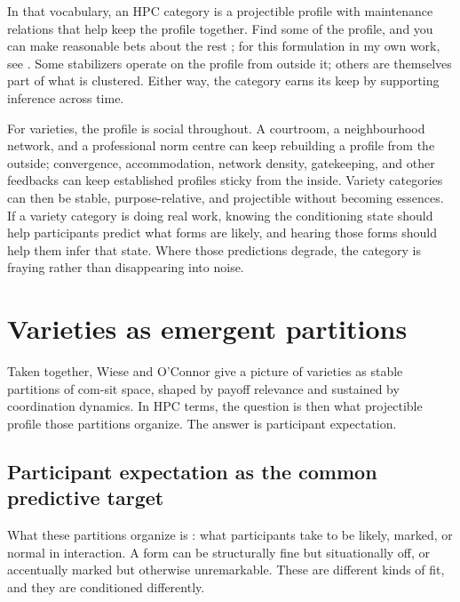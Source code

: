 \documentclass[11pt,letterpaper]{article}
\begin{document}
In that vocabulary, an HPC category is a projectible profile with maintenance relations that help keep the profile together. Find some of the profile, and you can make reasonable bets about the rest \citep{boyd1991,boyd1999}; for this formulation in my own work, see \textcite[chaps.~6 and 16]{reynolds2025hpcbook}. Some stabilizers operate on the profile from outside it; others are themselves part of what is clustered. Either way, the category earns its keep by supporting inference across time.

For varieties, the profile is social throughout. A courtroom, a neighbourhood network, and a professional norm centre can keep rebuilding a profile from the outside; convergence, accommodation, network density, gatekeeping, and other feedbacks can keep established profiles sticky from the inside. Variety categories can then be stable, purpose-relative, and projectible without becoming essences. If a variety category is doing real work, knowing the conditioning state should help participants predict what forms are likely, and hearing those forms should help them infer that state. Where those predictions degrade, the category is fraying rather than disappearing into noise.

\section{Varieties as emergent partitions}

Taken together, Wiese and O'Connor give a picture of varieties as stable partitions of com-sit space, shaped by payoff relevance and sustained by coordination dynamics. In HPC terms, the question is then what projectible profile those partitions organize. The answer is participant expectation.

\subsection{Participant expectation as the common predictive target}

What these partitions organize is : what participants take to be likely, marked, or normal in interaction. A form can be structurally fine but situationally off, or accentually marked but otherwise unremarkable. These are different kinds of fit, and they are conditioned differently.
\end{document}
